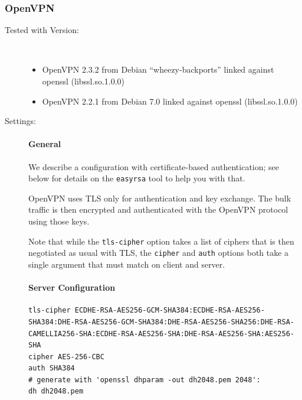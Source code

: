 \subsubsection{OpenVPN}

\begin{description}

\item[Tested with Version:] \mbox{}\\

\begin{itemize}
\item OpenVPN 2.3.2 from Debian ``wheezy-backports'' linked against openssl (libssl.so.1.0.0) 
\item OpenVPN 2.2.1 from Debian 7.0 linked against openssl (libssl.so.1.0.0) 
\end{itemize}

\item[Settings:] \mbox{}

\paragraph{General}\mbox{}

We describe a configuration with certificate-based authentication; see
below for details on the \verb|easyrsa| tool to help you with that.

OpenVPN uses TLS only for authentication and key exchange. The
bulk traffic is then encrypted and authenticated with the OpenVPN
protocol using those keys.

Note that while the \verb|tls-cipher| option takes a list of ciphers
that is then negotiated as usual with TLS, the \verb|cipher|
and \verb|auth| options both take a single argument that must match on
client and server.

\paragraph{Server Configuration}\mbox{}


\begin{lstlisting}[breaklines]
tls-cipher ECDHE-RSA-AES256-GCM-SHA384:ECDHE-RSA-AES256-SHA384:DHE-RSA-AES256-GCM-SHA384:DHE-RSA-AES256-SHA256:DHE-RSA-CAMELLIA256-SHA:ECDHE-RSA-AES256-SHA:DHE-RSA-AES256-SHA:AES256-SHA
cipher AES-256-CBC
auth SHA384
# generate with 'openssl dhparam -out dh2048.pem 2048':
dh dh2048.pem
\end{lstlisting}


\end{description}
